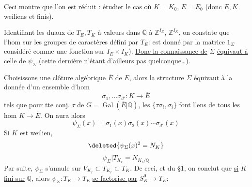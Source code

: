 Ceci montre que l'on est réduit : étudier  le cas où
$K=K_0$, $E=E_0$ (donc $E,K$ weiliens et finis).

Identifiant les duaux de $T_E,T_K$ à valeurs dans $\overline{\mathbb Q}$ à
$\mathbb Z^{I_E}$, $\mathbb Z^{I_K}$, on constate que l'hom
 sur les  groupes de caractères
défini par $T_E$:
est donné par la matrice $1_\Sigma$ considéré comme une fonction
 sur $I_E\times I_K$).
\uline{Donc la connaissance de} $\Sigma$ \uline{équivaut à celle de} $\psi_\Sigma$
(cette dernière n'étant d'ailleurs pas quelconque\ldots).

Choisissons une clôture algébrique $\overline E$ de $E$,
 
alors la structure $\Sigma$ équivaut à la donnée d'un ensemble  d'hom
\[
\sigma_1,\ldots\sigma_{d'}:K\longrightarrow\overline E
\]
 tels que pour tte conj. $\tau$ de $G=\operatorname{Gal}(\overline E|\mathbb Q)$,
les $\{\tau\sigma_i,\sigma_i\}$ font l'ens de \uline{tous} les hom $K\longrightarrow\overline E$.
On aura alors
\[
\psi_\Sigma(x)=\sigma_1(x)\sigma_2(x)\cdots\sigma_{d'}(x)
\]
Si $K$ est weilien,
\[
\deleted{\psi_\Sigma(x)^2=N_K}
\]
\[
\psi_\Sigma|T_{K_r}=N_{K_r/\mathbb Q}
\]
Par suite, $\psi_\Sigma$ s'annule sur $V_{K_r}\subset T_{K_r}\subset T_K$.
De ceci, et du §1, on conclut que \uline{si} $K$ \uline{fini sur} $\mathbb Q$,
alors $\psi_\Sigma:T_K\longrightarrow T_E$ \uline{se factorise par} $S_K^0\longrightarrow T_E$:
